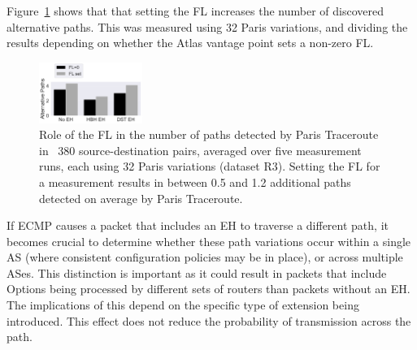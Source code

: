\documentclass[conference]{IEEEtran}
\begin{document}
Figure~\ref{fig:paths-fl} shows that that setting the FL increases the number of discovered alternative paths.
This was measured using 32 Paris variations, and dividing the results depending on whether the Atlas vantage point sets a non-zero FL.

\begin{figure}[t]
\centering
  \includegraphics[width=0.3\textwidth]{FL.png}
  \caption{Role of the FL in the number of paths detected by Paris Traceroute in ~380
source-destination pairs, averaged over five measurement runs, each using 32 Paris variations (dataset R3). Setting the FL for a measurement results in between 0.5 and 1.2 additional paths detected on average by Paris Traceroute.}
  \label{fig:paths-fl}
\end{figure}




If ECMP causes a packet that includes an EH to traverse a different path, it
becomes crucial to determine whether these path variations occur within a
single AS (where consistent configuration policies may be in
place), or across multiple ASes. This distinction is important as it could
result in packets that include Options being processed by different sets of routers than packets
without an EH. The implications of this depend on the specific type of
extension being introduced. This effect
does not reduce the probability of transmission across the path.
\end{document}
